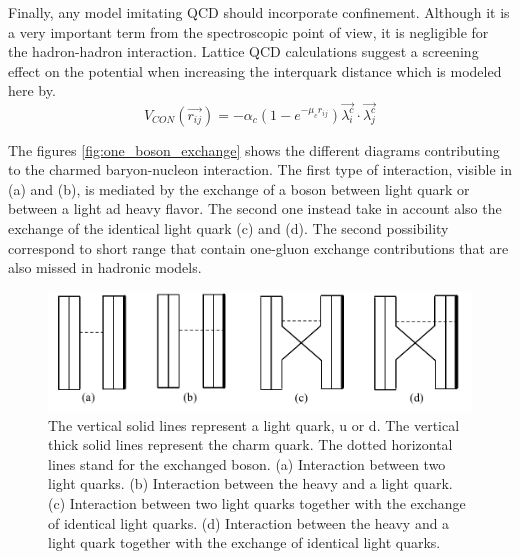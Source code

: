 \documentclass[12pt,a4paper]{book}
\begin{document}
	Finally, any model imitating QCD should incorporate confinement. Although it is a very important term from the spectroscopic point of view, it is negligible for the hadron-hadron interaction. Lattice QCD calculations suggest a screening effect on the potential when increasing the interquark distance which is modeled here by.
	\begin{equation}
		V_{CON}(\vec{r_{ij}})= -\alpha_c (1-e^{-\mu_c r_{ij}}) \vec{\lambda_i^c} \cdot \vec{\lambda_j^c}
		\label{eq:confinement}
	\end{equation}
	
	The figures \ref{fig:one_boson_exchange} shows the different diagrams contributing to the charmed baryon-nucleon interaction. The first type of interaction, visible in (a) and (b), is mediated by the exchange of a boson between light quark or between a light ad heavy flavor. The second one instead take in account also the exchange of the identical light quark (c) and (d). The second possibility correspond to short range that contain one-gluon exchange contributions that are also missed in hadronic models.
	
	\begin{figure}[ht]
		\centering
		\includegraphics[width=0.7\linewidth]{pictures/charmed_nucleos_interaction.png}
		\caption{ The vertical solid lines represent a light quark, u or d. The vertical thick solid lines represent the charm quark. The dotted horizontal lines stand for the exchanged boson. (a) Interaction between	two light quarks. (b) Interaction between the heavy and a light quark. (c) Interaction between	two light quarks together with the exchange of identical light quarks. (d) Interaction between the	heavy and a light quark together with the exchange of identical light quarks.}
		\label{fig:charmed_nucleos_interaction} 
	\end{figure}
	
\end{document}
